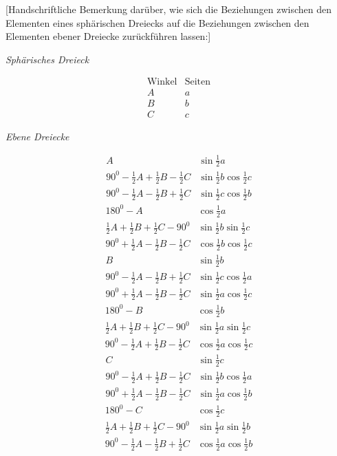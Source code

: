 %
\par\medskip{}
[Handschriftliche Bemerkung darüber, wie sich die Beziehungen zwischen den Elementen eines sphärischen Dreiecks auf die Beziehungen zwischen den Elementen ebener Dreiecke zurückführen lassen:]
\begin{center}\textit{Sphärisches Dreieck}\end{center}
\[
\begin{array}{cc}\text{Winkel}&\text{Seiten}\\ A&a\\B&b\\C&c\end{array}
\]
\begin{center}\textit{Ebene Dreiecke}\end{center}
\[
\begin{array}{ll}
A&\sin\tfrac12a\\
90^0-\tfrac12A+\tfrac12B-\tfrac12C&\sin\tfrac12b\cos\tfrac12c\\
90^0-\tfrac12A-\tfrac12B+\tfrac12C&\sin\tfrac12c\cos\tfrac12b
\end{array}
\]
\[
\begin{array}{ll}
180^0-A&\cos\tfrac12a\\
\tfrac12A+\tfrac12B+\tfrac12C-90^0&\sin\tfrac12b\sin\tfrac12c\\
90^0+\tfrac12A-\tfrac12B-\tfrac12C&\cos\tfrac12b\cos\tfrac12c
\end{array}
\]
\[
\begin{array}{ll}
B&\sin\tfrac12b\\
90^0-\tfrac12A-\tfrac12B+\tfrac12C&\sin\tfrac12c\cos\tfrac12a\\
90^0+\tfrac12A-\tfrac12B-\tfrac12C&\sin\tfrac12a\cos\tfrac12c
\end{array}
\]
\[
\begin{array}{ll}
180^0-B&\cos\tfrac12b\\
\tfrac12A+\tfrac12B+\tfrac12C-90^0&\sin\tfrac12a\sin\tfrac12c\\
90^0-\tfrac12A+\tfrac12B-\tfrac12C&\cos\tfrac12a\cos\tfrac12c
\end{array}
\]
\[
\begin{array}{ll}
C&\sin\tfrac12c\\
90^0-\tfrac12A+\tfrac12B-\tfrac12C&\sin\tfrac12b\cos\tfrac12a\\
90^0+\tfrac12A-\tfrac12B-\tfrac12C&\sin\tfrac12a\cos\tfrac12b
\end{array}
\]
\[
\begin{array}{ll}
180^0-C&\cos\tfrac12c\\
\tfrac12A+\tfrac12B+\tfrac12C-90^0&\sin\tfrac12a\sin\tfrac12b\\
90^0-\tfrac12A-\tfrac12B+\tfrac12C&\cos\tfrac12a\cos\tfrac12b
\end{array}
\]
